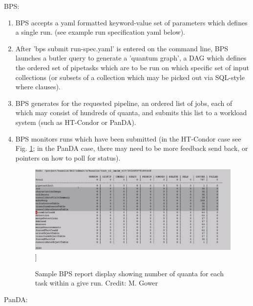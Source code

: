 \documentclass[DM,authoryear,toc]{lsstdoc}
\begin{document}
BPS:
\begin{enumerate}

\item BPS accepts a yaml formatted keyword-value set of parameters which
defines a single run. (see example run specification yaml below).

\item After 'bps submit run-spec.yaml' is entered on the command line, 
BPS launches a butler query to 
generate a 'quantum graph', a DAG which defines the ordered set of 
pipetasks which are to be run on which specific set of input 
collections (or subsets of a collection which may be picked out via SQL-style
where clauses).

\item BPS generates for the requested pipeline, an ordered list of jobs, 
each of which may consist of hundreds of quanta, and submits this 
list to a workload system (such as HT-Condor or PanDA).

\item BPS monitors runs which have been submitted  (in the HT-Condor case 
see Fig. \ref{bpsreport};  in the PanDA case, there may need to be more
feedback send back, or pointers on how to poll for status).

\begin{figure}
\includegraphics[width=\textwidth]{bpsreport.jpg}]
\caption{Sample BPS report display showing number of quanta for each task within a give run.
Credit: M. Gower}
\label{bpsreport}
\end{figure}


\end{enumerate}

PanDA:
\end{document}
